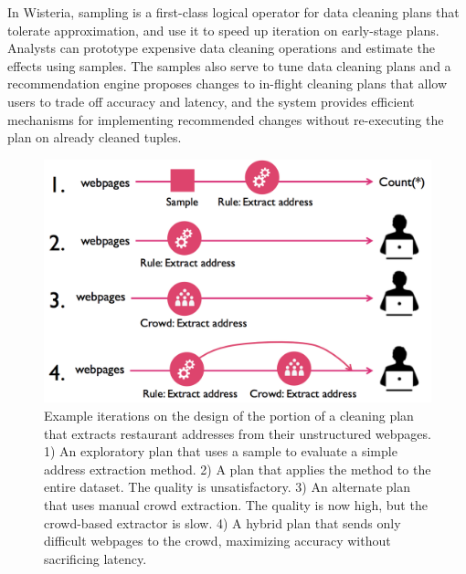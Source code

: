 In Wisteria, sampling is a first-class logical operator for data cleaning plans that tolerate approximation, and use it to speed up iteration on early-stage plans.
Analysts can prototype expensive data cleaning operations and estimate the effects using samples.
The samples also serve to tune data cleaning plans and a recommendation engine proposes changes to in-flight cleaning plans that allow users to trade off accuracy and latency, and the system provides efficient mechanisms for implementing recommended changes without re-executing the plan on already cleaned tuples.

\begin{figure}[t]
\centering
\vspace{-0.5cm}
\includegraphics[width = .4\textwidth]{figs/lifecycle.png}
\vspace{-0.4cm}
\caption{Example iterations on the design of the portion of a cleaning plan that extracts restaurant addresses from their unstructured webpages.  
1) An exploratory plan that uses a sample to evaluate a simple address extraction method.
2) A plan that applies the method to the entire dataset. The quality is unsatisfactory. 
3) An alternate plan that uses manual crowd extraction. The quality is now high, but the crowd-based extractor is slow. 
4) A hybrid plan that sends only difficult webpages to the crowd, maximizing accuracy without sacrificing latency.}
\label{fig:ex-plan}
\vspace{-0.3cm}
\end{figure}



